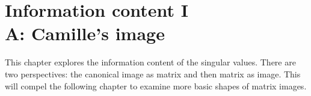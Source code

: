 \chapter{Information content I\\A: Camille's image}

This chapter explores the information content of the singular values. There are two perspectives: the canonical image as matrix and then matrix as image. This will compel the following chapter to examine more basic shapes of matrix images.

%






\endinput
%
%
%
%
%
%
%
%
%
%
%
%
%
%

\endinput